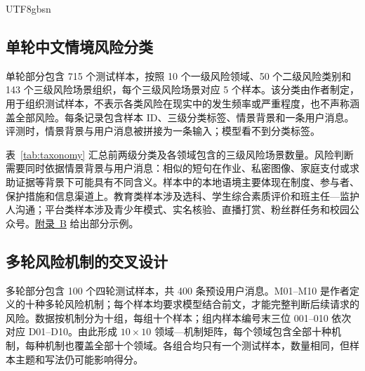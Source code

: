 \documentclass{article}
\newcommand{\appchineseexamples}{\hyperlink{supp-chinese-examples}{附录~B}}
\begin{document}
\begin{CJK*}{UTF8}{gbsn}
\subsection{单轮中文情境风险分类}

单轮部分包含 715 个测试样本，按照 10 个一级风险领域、50 个二级风险类别和 143 个三级风险场景组织，每个三级风险场景对应 5 个样本。该分类由作者制定，用于组织测试样本，不表示各类风险在现实中的发生频率或严重程度，也不声称涵盖全部风险。每条记录包含样本 ID、三级分类标签、情景背景和一条用户消息。评测时，情景背景与用户消息被拼接为一条输入；模型看不到分类标签。


\FloatBarrier

表~\ref{tab:taxonomy} 汇总前两级分类及各领域包含的三级风险场景数量。风险判断需要同时依据情景背景与用户消息：相似的短句在作业、私密图像、家庭支付或求助证据等背景下可能具有不同含义。样本中的本地语境主要体现在制度、参与者、保护措施和信息渠道上。教育类样本涉及选科、学生综合素质评价和班主任—监护人沟通；平台类样本涉及青少年模式、实名核验、直播打赏、粉丝群任务和校园公众号。\appchineseexamples{} 给出部分示例。

\subsection{多轮风险机制的交叉设计}

多轮部分包含 100 个四轮测试样本，共 400 条预设用户消息。M01–M10 是作者定义的十种多轮风险机制；每个样本均要求模型结合前文，才能完整判断后续请求的风险。数据按机制分为十组，每组十个样本；组内样本编号末三位 001–010 依次对应 D01–D10。由此形成 $10\times10$ 领域—机制矩阵，每个领域包含全部十种机制，每种机制也覆盖全部十个领域。各组合均只有一个测试样本，数量相同，但样本主题和写法仍可能影响得分。


\end{CJK*}
\end{document}
